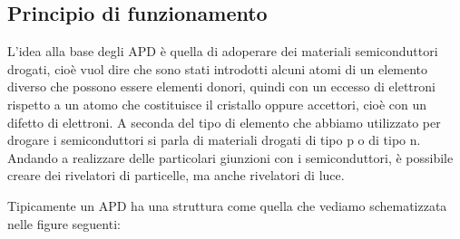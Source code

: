 \subsection{Principio di funzionamento}
L'idea alla base degli APD è quella di adoperare dei materiali semiconduttori drogati, cioè vuol dire che sono stati introdotti alcuni atomi di un elemento diverso che possono essere elementi donori, quindi con un eccesso di elettroni rispetto a un atomo che costituisce il cristallo oppure accettori, cioè con un difetto di elettroni. A seconda del tipo di elemento che abbiamo utilizzato per drogare i semiconduttori si parla di materiali drogati di tipo p o di tipo n. Andando a realizzare delle particolari giunzioni con i semiconduttori, è possibile creare dei rivelatori di particelle, ma anche rivelatori di luce.

Tipicamente un APD ha una struttura come quella che vediamo schematizzata nelle figure seguenti:

